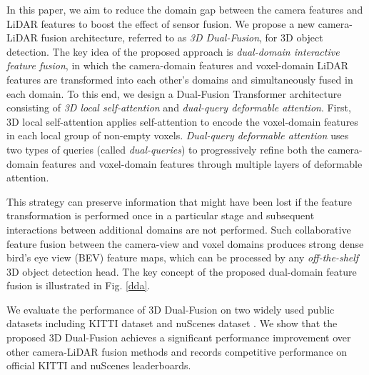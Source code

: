 \documentclass[lettersize,journal]{IEEEtran}
\begin{document}
In this paper, we aim to reduce the domain gap between the camera features and LiDAR features to boost the effect of sensor fusion. We  propose a new camera-LiDAR fusion architecture, referred to as {\it 3D Dual-Fusion}, for 3D object detection.  The key idea of the proposed approach is {\it dual-domain interactive feature fusion}, in which the camera-domain features and voxel-domain LiDAR features are transformed into each other's domains and simultaneously fused in each domain. To this end, we design a Dual-Fusion Transformer architecture consisting of {\it 3D local self-attention} and {\it dual-query deformable attention}. First, 3D local self-attention applies self-attention to encode the voxel-domain features in each local group of non-empty voxels.  {\it Dual-query deformable attention} uses two types of queries (called {\it dual-queries}) to progressively refine both the camera-domain features and voxel-domain features through multiple layers of deformable attention.  

This strategy can preserve information that might have been lost if the feature transformation is performed once in a particular stage and subsequent interactions between additional domains are not performed. Such collaborative feature fusion  between the camera-view and voxel domains produces strong dense bird's eye view (BEV) feature maps, which can be processed by any {\it off-the-shelf} 3D object detection head.  The key concept of the proposed dual-domain feature fusion is illustrated in Fig. \ref{dda}. 

We evaluate the performance of 3D Dual-Fusion on two widely used public datasets including KITTI dataset \cite{kitti} and nuScenes dataset \cite{nuscenes}. We show that the proposed 3D Dual-Fusion achieves a significant performance improvement over other camera-LiDAR fusion methods and records competitive performance on official KITTI and nuScenes leaderboards.
 
\end{document}
